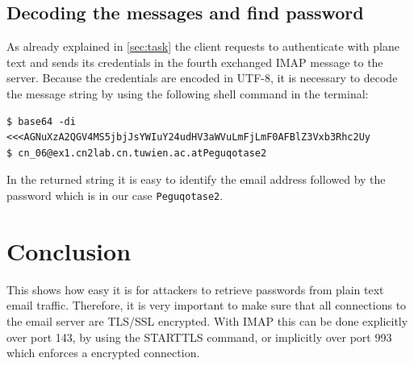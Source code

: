 \documentclass[parskip=full]{scrartcl}
\begin{document}
\subsection{Decoding the messages and find password} \label{subsec:decode}
As already explained in \cref{sec:task} the client requests to authenticate with plane text and sends its credentials in the fourth exchanged IMAP message to the server. 
Because the credentials are encoded in UTF-8, it is necessary to decode the message string by using the following shell command in the terminal:
\begin{verbatim}
$ base64 -di <<<AGNuXzA2QGV4MS5jbjJsYWIuY24udHV3aWVuLmFjLmF0AFBlZ3Vxb3Rhc2Uy
$ cn_06@ex1.cn2lab.cn.tuwien.ac.atPeguqotase2
\end{verbatim}
In the returned string it is easy to identify the email address followed by the password which is in our case \verb|Peguqotase2|. 

\section{Conclusion}

This shows how easy it is for attackers to retrieve passwords from plain text email traffic. Therefore, it is very important to make sure that all connections to the email server are TLS/SSL encrypted. With IMAP this can be done explicitly over port 143, by using the STARTTLS command, or implicitly over port 993 which enforces a encrypted connection.



\printbibliography

\end{document}
